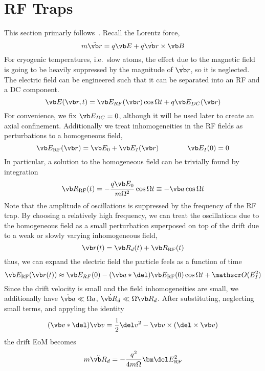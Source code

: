 \documentclass[12pt]{article}
\begin{document}
\section{RF Traps}
This section primarly follows~\cite{gerlich_inhomogeneous_1992}.
Recall the Lorentz force,
\begin{equation}
    m\ddot{\vb r} = q\vb E+q\dot{\vb r}\times \vb B
\end{equation}
For cryogenic temperatures, i.e.\ slow atoms, the effect due to the magnetic field is going to be heavily suppressed by the magnitude of \( \dot{\vb r} \), so it is neglected. The electric field can be engineered such that it can be separated into an RF and a DC component.
\begin{equation}
    \vb E(\vb r, t) = \vb E_{RF}(\vb r)\cos\Omega t + q\vb E_{DC}(\vb r)
\end{equation}
For convenience, we fix \( \vb E_{DC}=0 \), although it will be used later to create an axial confinement. Additionally we treat inhomogeneities in the RF fields as perturbations to a homogeneous field, 
\begin{equation}
    \vb E_\text{RF}(\vb r)=\vb E_0+\vb E_I(\vb r) \qquad\qquad\vb E_I(0)=0
\end{equation}
In particular, a solution to the homogeneous field can be trivially found by integration
\begin{equation}
    \vb R_\text{RF}(t)=-\frac{q\vb E_0}{m\Omega^2}\cos\Omega t\equiv -\vb a\cos\Omega t
\end{equation}
Note that the amplitude of oscillations is suppressed by the frequency of the RF trap. By choosing a relatively high frequency, we can treat the oscillations due to the homogeneous field as a small perturbation superposed on top of the drift due to a weak or slowly varying inhomogeneous field,
\begin{equation}
    \vb r(t) = \vb R_d(t)+\vb R_\text{RF}(t)
\end{equation}
thus, we can expand the electric field the particle feels as a function of time
\[ \vb E_\text{RF}(\vb r(t))\approx \vb E_{RF}(0)-(\vb a*\del)\vb E_\text{RF}(0)\cos\Omega t+\mathscr O(E_I^2) \]
Since the drift velocity is small and the field inhomogeneities are small, we additionally have \( \dot {\vb a}\ll \Omega a \), \( \dot{\vb R_d}\ll \Omega\vb R_d\). After substituting, neglecting small terms, and appyling the identity
\[ (\vb v*\del)\vb v = \frac{1}{2}\del v^2-\vb v\times(\del\times\vb v) \]
the drift EoM becomes
\begin{equation}
    m\ddot {\vb R}_d=-\frac{q^2}{4m\Omega}\bm\del E_\text{RF}^2
\end{equation}
\end{document}
